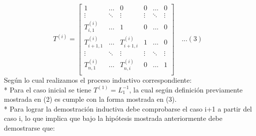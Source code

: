 \[T^{(i)}=
\begin{bmatrix}
    1  & \dots & 0 & 0 & \dots & 0 \\
   \vdots  & \ddots & \vdots & \vdots & \ddots & \vdots \\
     T_{i,1}^{(i)} & \dots & 1 & 0 & \dots & 0 \\
    T_{i+1,1}^{(i)} & \dots &  T_{i+1,i}^{(i)} & 1 & \dots & 0 \\
   \vdots  & \ddots & \vdots & \vdots & \ddots & \vdots \\
    T_{n,1}^{(i)} & \dots &  T_{n,i}^{(i)} & 0 & \dots & 1 \\
\end{bmatrix}\quad ...(3)
\]
Según lo cual realizamos el proceso inductivo correspondiente:\\

* Para el caso inicial se tiene $T^{(1)}=L_1^{-1}$, la cual según definición previamente mostrada en (2) es cumple con la forma mostrada en (3).\\
* Para lograr la demostración inductiva debe comprobarse el caso i+1 a partir del caso i, lo que implica que bajo la hipótesis mostrada anteriormente debe demostrarse que:\\

